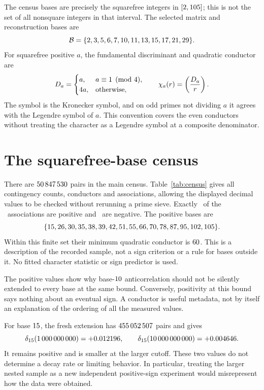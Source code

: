 \documentclass[11pt]{article}
\begin{document}
The census bases are precisely the squarefree integers in
$[2,105]$; this is not the set of all nonsquare integers in that
interval. The selected matrix and reconstruction bases are
\[
 \mathcal B=\{2,3,5,6,7,10,11,13,15,17,21,29\}.
\]
For squarefree positive $a$, the fundamental discriminant and quadratic
conductor are
\[
 D_a=\begin{cases}a,&a\equiv1\pmod{4},\\
 4 a,&\text{otherwise},\end{cases}
 \qquad \chi_a(r)=\left(\frac{D_a}{r}\right).
\]
The symbol is the Kronecker symbol, and on odd primes not dividing $a$ it agrees
with the Legendre symbol of $a$. This convention covers the even conductors
without treating the character as a Legendre symbol at a composite denominator.

\section{The squarefree-base census}
There are $50\,847\,530$ pairs in the main census. Table~\ref{tab:census} gives all
contingency counts, conductors and associations, allowing the displayed decimal
values to be checked without rerunning a prime sieve. Exactly \PositiveCount\
of the \BaseCount\ associations are positive and \NegativeCount\ are negative.
The positive bases are
\[
 \{15,26,30,35,38,39,42,51,55,66,70,78,87,95,102,105\}.
\]
Within this finite set their minimum quadratic conductor is
$60$. This is a description of the recorded sample, not a
sign criterion or a rule for bases outside it. No fitted character statistic or
sign predictor is used.

The positive values show why base-$10$ anticorrelation should not be silently
extended to every base at the same bound. Conversely, positivity at this bound
says nothing about an eventual sign. A conductor is useful metadata, not by
itself an explanation of the ordering of all the measured values.

For base $15$, the fresh extension has $455\,052\,507$ pairs and gives
\[
 \delta_{15}(1\,000\,000\,000)=+0.012196,
 \qquad
 \delta_{15}(10\,000\,000\,000)=+0.004646.
\]
It remains positive and is smaller at the larger cutoff. These two values do
not determine a decay rate or limiting behavior. In particular, treating the
larger nested sample as a new independent positive-sign experiment would
misrepresent how the data were obtained.

\begingroup\small
\setlength{\tabcolsep}{4pt}

\endgroup
\end{document}
